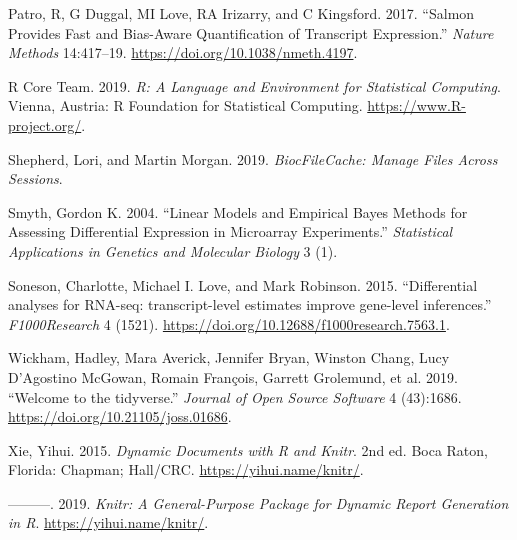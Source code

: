 \documentclass[
]{article}
\begin{document}
\leavevmode\hypertarget{ref-salmon}{}%
Patro, R, G Duggal, MI Love, RA Irizarry, and C Kingsford. 2017. ``Salmon Provides Fast and Bias-Aware Quantification of Transcript Expression.'' \emph{Nature Methods} 14:417--19. \url{https://doi.org/10.1038/nmeth.4197}.

\leavevmode\hypertarget{ref-baser}{}%
R Core Team. 2019. \emph{R: A Language and Environment for Statistical Computing}. Vienna, Austria: R Foundation for Statistical Computing. \url{https://www.R-project.org/}.

\leavevmode\hypertarget{ref-bcfilecache}{}%
Shepherd, Lori, and Martin Morgan. 2019. \emph{BiocFileCache: Manage Files Across Sessions}.

\leavevmode\hypertarget{ref-Smyth2004}{}%
Smyth, Gordon K. 2004. ``Linear Models and Empirical Bayes Methods for Assessing Differential Expression in Microarray Experiments.'' \emph{Statistical Applications in Genetics and Molecular Biology} 3 (1).

\leavevmode\hypertarget{ref-Soneson2015}{}%
Soneson, Charlotte, Michael I. Love, and Mark Robinson. 2015. ``Differential analyses for RNA-seq: transcript-level estimates improve gene-level inferences.'' \emph{F1000Research} 4 (1521). \url{https://doi.org/10.12688/f1000research.7563.1}.

\leavevmode\hypertarget{ref-tidyverse}{}%
Wickham, Hadley, Mara Averick, Jennifer Bryan, Winston Chang, Lucy D'Agostino McGowan, Romain François, Garrett Grolemund, et al. 2019. ``Welcome to the tidyverse.'' \emph{Journal of Open Source Software} 4 (43):1686. \url{https://doi.org/10.21105/joss.01686}.

\leavevmode\hypertarget{ref-xie2015}{}%
Xie, Yihui. 2015. \emph{Dynamic Documents with R and Knitr}. 2nd ed. Boca Raton, Florida: Chapman; Hall/CRC. \url{https://yihui.name/knitr/}.

\leavevmode\hypertarget{ref-knitr}{}%
---------. 2019. \emph{Knitr: A General-Purpose Package for Dynamic Report Generation in R}. \url{https://yihui.name/knitr/}.
\end{document}
